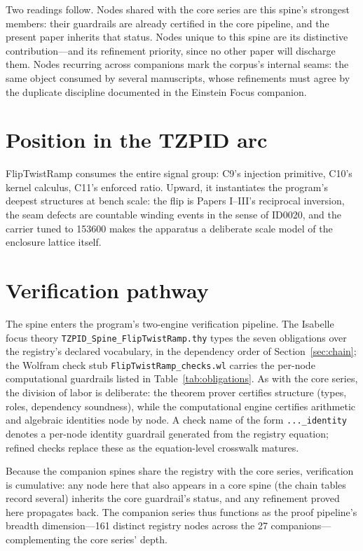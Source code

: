 \documentclass[11pt]{article}
\theoremstyle{remark}
\begin{document}
Two readings follow. Nodes shared with the core series are this spine's strongest members: their guardrails are already certified in the core pipeline, and the present paper inherits that status. Nodes unique to this spine are its distinctive contribution---and its refinement priority, since no other paper will discharge them. Nodes recurring across companions mark the corpus's internal seams: the same object consumed by several manuscripts, whose refinements must agree by the duplicate discipline documented in the Einstein Focus companion.

\section{Position in the TZPID arc}
\label{sec:arc}

FlipTwistRamp consumes the entire signal group: C9's injection primitive, C10's kernel calculus, C11's enforced ratio. Upward, it instantiates the program's deepest structures at bench scale: the flip is Papers I--III's reciprocal inversion, the seam defects are countable winding events in the sense of ID0020, and the carrier tuned to 153600 makes the apparatus a deliberate scale model of the enclosure lattice itself.

\section{Verification pathway}
\label{sec:verify}

The spine enters the program's two-engine verification pipeline. The Isabelle focus theory \texttt{TZPID\_Spine\_FlipTwistRamp.thy} types the seven obligations over the registry's declared vocabulary, in the dependency order of Section~\ref{sec:chain}; the Wolfram check stub \texttt{FlipTwistRamp\_checks.wl} carries the per-node computational guardrails listed in Table~\ref{tab:obligations}. As with the core series, the division of labor is deliberate: the theorem prover certifies structure (types, roles, dependency soundness), while the computational engine certifies arithmetic and algebraic identities node by node. A check name of the form \texttt{...\_identity} denotes a per-node identity guardrail generated from the registry equation; refined checks replace these as the equation-level crosswalk matures.

Because the companion spines share the registry with the core series, verification is cumulative: any node here that also appears in a core spine (the chain tables record several) inherits the core guardrail's status, and any refinement proved here propagates back. The companion series thus functions as the proof pipeline's breadth dimension---161 distinct registry nodes across the 27 companions---complementing the core series' depth.
\end{document}
